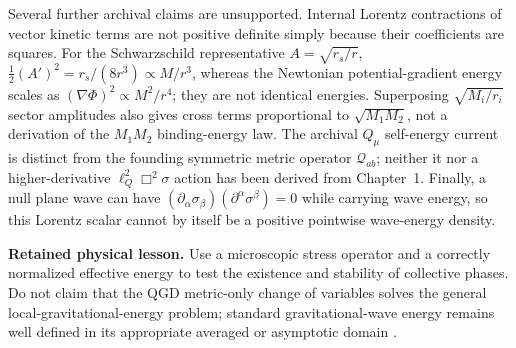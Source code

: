 \documentclass[11pt,a4paper]{article}
\theoremstyle{definition}\newtheorem{definition}[theorem]{Definition}
\theoremstyle{remark}\newtheorem{remark}[theorem]{Remark}
\begin{document}
Several further archival claims are unsupported. Internal Lorentz contractions of vector kinetic terms are not positive definite simply because their coefficients are squares. For the Schwarzschild representative $A=\sqrt{r_s/r}$, $\tfrac12(A')^2=r_s/(8r^3)\propto M/r^3$, whereas the Newtonian potential-gradient energy scales as $(\nabla\Phi)^2\propto M^2/r^4$; they are not identical energies. Superposing $\sqrt{M_i/r_i}$ sector amplitudes also gives cross terms proportional to $\sqrt{M_1M_2}$, not a derivation of the $M_1M_2$ binding-energy law. The archival $Q_\mu$ self-energy current is distinct from the founding symmetric metric operator $\mathcal Q_{ab}$; neither it nor a higher-derivative $\ell_Q^2\Box^2\sigma$ action has been derived from Chapter~1. Finally, a null plane wave can have $(\partial_\alpha\sigma_\beta)(\partial^\alpha\sigma^\beta)=0$ while carrying wave energy, so this Lorentz scalar cannot by itself be a positive pointwise wave-energy density.

\textbf{Retained physical lesson.} Use a microscopic stress operator and a correctly normalized effective energy to test the existence and stability of collective phases. Do not claim that the QGD metric-only change of variables solves the general local-gravitational-energy problem; standard gravitational-wave energy remains well defined in its appropriate averaged or asymptotic domain \cite{Isaacson1968}.
\end{document}
